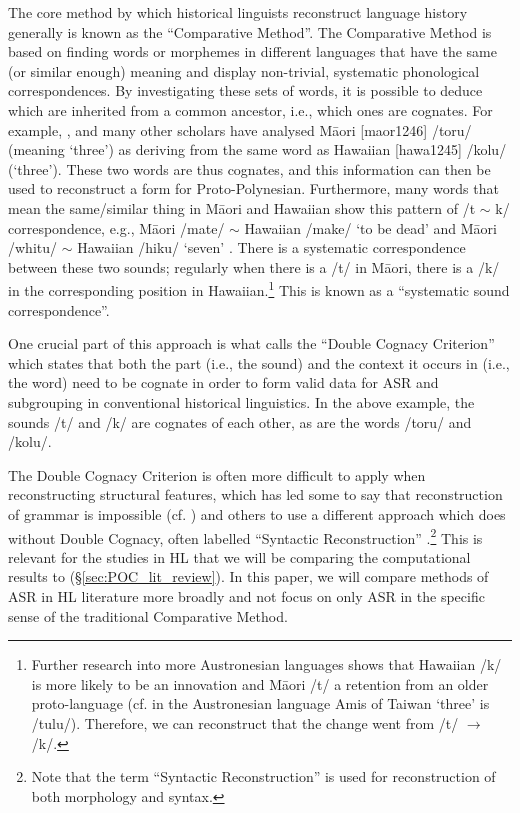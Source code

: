 \documentclass[12pt,letterpaper]{article}
\begin{document}
The core method by which historical linguists reconstruct language history generally is known as the ``Comparative Method''. The Comparative Method is based on finding words or morphemes in different languages that have the same (or similar enough) meaning and display non-trivial, systematic phonological correspondences. By investigating these sets of words, it is possible to deduce which are inherited from a common ancestor, i.e., which ones are cognates. For example, \citet{blust2004}, \citet{greenhill2011pollex} and many other scholars have analysed M\={a}ori [maor1246] /toru/ (meaning `three') as deriving from the same word as Hawaiian [hawa1245] /kolu/ (`three'). These two words are thus cognates, and this information can then be used to reconstruct a form for Proto-Polynesian. Furthermore, many words that mean the same/similar thing in M\={a}ori and Hawaiian show this pattern of /t $\sim$ k/ correspondence, e.g., M\={a}ori /mate/ $\sim$ Hawaiian /make/ `to be dead' and M\={a}ori /whitu/ $\sim$ Hawaiian /hiku/ `seven' \citep{ABVD}. There is a systematic correspondence between these two sounds; regularly when there is a /t/ in M\={a}ori, there is a /k/ in the corresponding position in Hawaiian.\footnote{Further research into more Austronesian languages shows that Hawaiian /k/ is more likely to be an innovation and M\={a}ori /t/ a retention from an older proto-language (cf. in the Austronesian language Amis of Taiwan `three' is /tulu/). Therefore, we can reconstruct that the change went from /t/ $\rightarrow$ /k/.} This is known as a ``systematic sound correspondence''. 

One crucial part of this approach is what \citet{walkden_2013} calls the ``Double Cognacy Criterion'' which states that both the part (i.e., the sound) and the context it occurs in (i.e., the word) need to be cognate in order to form valid data for ASR and subgrouping in conventional historical linguistics. In the above example, the sounds /t/ and /k/ are cognates of each other, as are the words /toru/ and /kolu/.

The Double Cognacy Criterion is often more difficult to apply when reconstructing structural features, which has led some to say that reconstruction of grammar is impossible (cf. \citealt{lightfoot_2002b}) and others to use a different approach which does without Double Cognacy, often labelled ``Syntactic Reconstruction'' \citep[17]{clark1973aspects}.\footnote{Note that the term ``Syntactic Reconstruction'' is used for reconstruction of both morphology and syntax.} This is relevant for the studies in HL that we will be comparing the computational results to (§\ref{sec:POC_lit_review}). In this paper, we will compare methods of ASR in HL literature more broadly and not focus on only ASR in the specific sense of the traditional Comparative Method.
\end{document}
